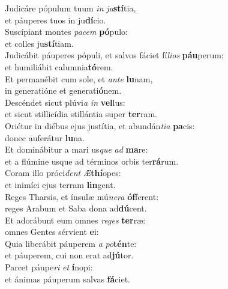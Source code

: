 \evenverse Judicáre pópulum tuum \textit{in} \textit{ju}\textbf{stí}tia,~\*\\
\evenverse et páuperes tuos in ju\textbf{dí}cio.\\
\oddverse Suscípiant montes \textit{pa}\textit{cem} \textbf{pó}pulo:~\*\\
\oddverse et colles ju\textbf{stí}tiam.\\
\evenverse Judicábit páuperes pópuli, et salvos fáciet fí\textit{li}\textit{os} \textbf{páu}perum:~\*\\
\evenverse et humiliábit calumnia\textbf{tó}rem.\\
\oddverse Et permanébit cum sole, et \textit{an}\textit{te} \textbf{lu}nam,~\*\\
\oddverse in generatióne et generati\textbf{ó}nem.\\
\evenverse Descéndet sicut plúvi\textit{a} \textit{in} \textbf{vel}lus:~\*\\
\evenverse et sicut stillicídia stillántia super \textbf{ter}ram.\\
\oddverse Oriétur in diébus ejus justítia, et abundán\textit{ti}\textit{a} \textbf{pa}cis:~\*\\
\oddverse donec auferátur \textbf{lu}na.\\
\evenverse Et dominábitur a mari us\textit{que} \textit{ad} \textbf{ma}re:~\*\\
\evenverse et a flúmine usque ad términos orbis ter\textbf{rá}rum.\\
\oddverse Coram illo próci\textit{dent} \textit{Æ}\textbf{thí}opes:~\*\\
\oddverse et inimíci ejus terram \textbf{lin}gent.\\
\evenverse Reges Tharsis, et ínsulæ mú\textit{ne}\textit{ra} \textbf{óf}ferent:~\*\\
\evenverse reges Arabum et Saba dona ad\textbf{dú}cent.\\
\oddverse Et adorábunt eum omnes \textit{re}\textit{ges} \textbf{ter}ræ:~\*\\
\oddverse omnes Gentes sérvient \textbf{e}i:\\
\evenverse Quia liberábit páuperem \textit{a} \textit{po}\textbf{tén}te:~\*\\
\evenverse et páuperem, cui non erat ad\textbf{jú}tor.\\
\oddverse Parcet páupe\textit{ri} \textit{et} \textbf{í}nopi:~\*\\
\oddverse et ánimas páuperum salvas \textbf{fá}ciet.\\
